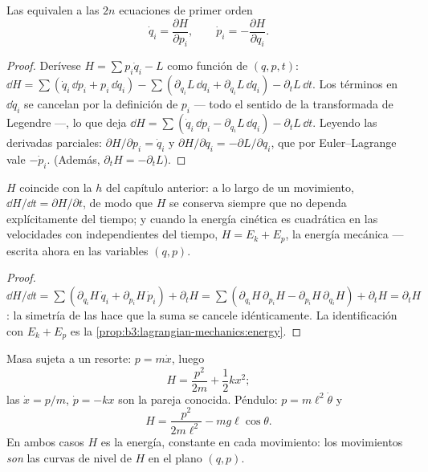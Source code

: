 \begin{theorem}\label{thm:b3:hamiltonian-mechanics:canonical}
Las  equivalen a las $2n$ ecuaciones de primer
orden
\[
\dot q_i = \frac{\partial H}{\partial p_i} , \qquad
\dot p_i = -\frac{\partial H}{\partial q_i} .
\]
\end{theorem}

\begin{proof}
Derívese $H = \sum p_i\dot q_i - L$ como función de $(q, p, t)$:
$\dd H = \sum(\dot q_i\,\dd p_i + p_i\,\dd\dot q_i) - \sum(
\partial_{q_i}L\,\dd q_i + \partial_{\dot q_i}L\,\dd\dot q_i) -
\partial_tL\,\dd t$. Los términos en $\dd\dot q_i$ se cancelan por la
definición de $p_i$ --- todo el sentido de la transformada de Legendre ---,
lo que deja $\dd H = \sum(\dot q_i\,\dd p_i - \partial_{q_i}L\,\dd q_i) -
\partial_tL\,\dd t$. Leyendo las derivadas parciales:
$\partial H/\partial p_i = \dot q_i$ y $\partial H/\partial q_i =
-\partial L/\partial q_i$, que por Euler--Lagrange vale $-\dot p_i$.
(Además, $\partial_tH = -\partial_tL$).
\end{proof}

\begin{proposition}[Qué es $H$]\label{prop:b3:hamiltonian-mechanics:energy}
$H$ coincide con la  $h$ del capítulo anterior: a lo largo de
un movimiento, $\dd H/\dd t = \partial H/\partial t$, de modo que $H$ se
conserva siempre que no dependa explícitamente del tiempo; y cuando la
energía cinética es cuadrática en las velocidades con 
independientes del tiempo, $H = E_k + E_p$, la energía mecánica --- escrita
ahora en las variables $(q, p)$.
\end{proposition}

\begin{proof}
$\dd H/\dd t = \sum(\partial_{q_i}H\,\dot q_i + \partial_{p_i}H\,\dot
p_i) + \partial_tH = \sum(\partial_{q_i}H\,\partial_{p_i}H -
\partial_{p_i}H\,\partial_{q_i}H) + \partial_tH = \partial_tH$: la
simetría de las  hace que la suma se cancele
idénticamente. La identificación con $E_k + E_p$ es la
\cref{prop:b3:lagrangian-mechanics:energy}.
\end{proof}

\begin{example}\label{ex:b3:hamiltonian-mechanics:examples}
Masa sujeta a un resorte: $p = m\dot x$, luego
\[
H = \frac{p^2}{2m} + \frac12 kx^2 ;
\]
las  $\dot x = p/m$, $\dot p = -kx$ son la pareja
conocida. Péndulo: $p = m\ell^2\dot\theta$ y
\[
H = \frac{p^2}{2m\ell^2} - mg\ell\cos\theta .
\]
En ambos casos $H$ es la energía, constante en cada movimiento: los
movimientos \emph{son} las curvas de nivel de $H$ en el plano $(q,p)$.
\end{example}

